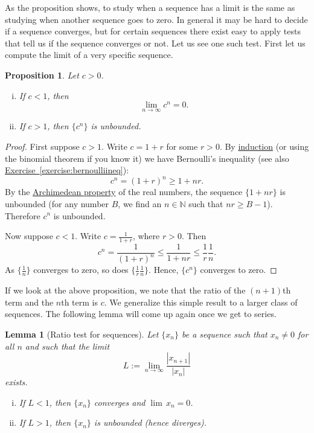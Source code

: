 \documentclass[12pt]{book}
\newcommand{\abs}[1]{\left\lvert {#1} \right\rvert}
\newcommand{\N}{{\mathbb{N}}}
\theoremstyle{plain}
\newtheorem{lemma}[thm]{Lemma}
\newtheorem{prop}[thm]{Proposition}
\theoremstyle{remark}
\theoremstyle{definition}
\theoremstyle{exercise}
\theoremstyle{example}
\newcommand{\exerciseref}[1]{\hyperref[#1]{Exercise~\ref*{#1}}}
\begin{document}
As the proposition shows, to study when a sequence has a limit is 
the same as studying when another sequence goes to zero.
In general it may be hard to decide if a sequence converges, but
for certain sequences there exist easy to apply tests that tell us
if the sequence converges or not.  Let us see one such test.
First let
us compute the limit of a very specific sequence.
\begin{prop}
Let $c > 0$.
\begin{enumerate}[(i)]
\item
If $c < 1$, then
\begin{equation*}
\lim_{n\to\infty} c^n = 0.
\end{equation*}
\item
If $c > 1$, then $\{ c^n \}$ is unbounded.
\end{enumerate}
\end{prop}

\begin{proof}
First suppose $c > 1$.  Write
$c = 1+r$ for some $r > 0$.  By \hyperref[induction:thm]{induction} (or using the binomial theorem
if you know it) we have Bernoulli's inequality (see also
\exerciseref{exercise:bernoulliineq}):
\begin{equation*}
c^n = {(1+r)}^n \geq 1+nr .
\end{equation*}
By the \hyperref[thm:arch:i]{Archimedean property}
of the real numbers, the sequence $\{ 1+nr \}$
is unbounded (for any number $B$, we find an $n \in \N$ such that $nr \geq
B-1$).  Therefore $c^n$ is unbounded.

Now suppose $c < 1$.  Write $c = \frac{1}{1+r}$, where $r > 0$.  Then
\begin{equation*}
c^n = \frac{1}{{(1+r)}^n} \leq
\frac{1}{1+nr} \leq \frac{1}{r} \frac{1}{n} .
\end{equation*}
As $\{ \frac{1}{n} \}$ converges to zero, so does
$\{ \frac{1}{r} \frac{1}{n} \}$.  Hence, $\{ c^n \}$ converges to zero.
\end{proof}

If we look at the above proposition, we note that the
ratio of the $(n+1)$th term and the $n$th term is $c$.  We 
generalize this simple result to a larger class of sequences.
The following lemma will come up again once we get to series.

\begin{lemma}[Ratio test for sequences]
\label{seq:ratiotest}
Let $\{ x_n \}$ be a sequence such that $x_n \not= 0$ for all $n$ and such that
the limit
\begin{equation*}
L := \lim_{n\to\infty} \frac{\abs{x_{n+1}}}{\abs{x_n}}
\end{equation*}
exists.
\begin{enumerate}[(i)]
\item
If $L < 1$, then $\{ x_n \}$ converges and $\lim\, x_n = 0$.
\item
If $L > 1$, then $\{ x_n \}$ is unbounded (hence diverges).
\end{enumerate}
\end{lemma}
\end{document}
